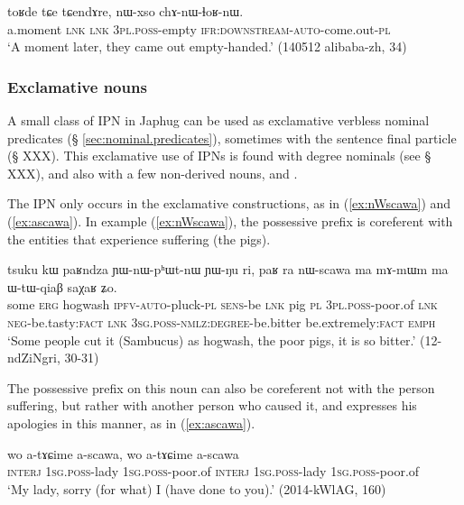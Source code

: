 \begin{exe}
\ex \label{ex:nWxso.chAnWlhoRnW}
\gll toʁde tɕe tɕendɤre, nɯ-xso chɤ-nɯ-ɬoʁ-nɯ. \\
a.moment \textsc{lnk} \textsc{lnk} \textsc{3pl.poss}-empty \textsc{ifr}:\textsc{downstream}-\textsc{auto}-come.out-\textsc{pl} \\
\glt `A moment later, they came out empty-handed.' (140512 alibaba-zh, 34)
\end{exe} 

\subsubsection{Exclamative nouns}
A small class of IPN in Japhug can be used as exclamative verbless nominal predicates (§ \ref{sec:nominal.predicates}), sometimes with the sentence final particle  (§ XXX). This exclamative use of IPNs is found with degree nominals (see § XXX), and also with a few non-derived nouns,  and .

The IPN  only occurs in the exclamative constructions, as in (\ref{ex:nWscawa}) and (\ref{ex:ascawa}). In example (\ref{ex:nWscawa}), the possessive prefix is coreferent with the entities that experience suffering (the pigs).

\begin{exe}
\ex \label{ex:nWscawa} 
\gll tsuku kɯ paʁndza ɲɯ-nɯ-pʰɯt-nɯ ɲɯ-ŋu ri, paʁ ra nɯ-scawa ma mɤ-mɯm ma ɯ-tɯ-qiaβ saχaʁ ʑo. \\
some \textsc{erg} hogwash \textsc{ipfv}-\textsc{auto}-pluck-\textsc{pl} \textsc{sens}-be \textsc{lnk} pig \textsc{pl} \textsc{3pl}.\textsc{poss}-poor.of \textsc{lnk} \textsc{neg}-be.tasty:\textsc{fact} \textsc{lnk} \textsc{3sg}.\textsc{poss}-\textsc{nmlz}:\textsc{degree}-be.bitter be.extremely:\textsc{fact} \textsc{emph} \\
\glt `Some people cut it (Sambucus) as hogwash, the poor pigs, it is so bitter.' (12-ndZiNgri, 30-31)
\end{exe}

The possessive prefix on this noun can also be coreferent not with the person suffering, but rather with another person who caused it, and expresses his apologies in this manner, as in (\ref{ex:ascawa}).

\begin{exe}
\ex \label{ex:ascawa}
\gll wo a-tɤɕime a-scawa, wo a-tɤɕime a-scawa \\
\textsc{interj} \textsc{1sg}.\textsc{poss}-lady \textsc{1sg}.\textsc{poss}-poor.of \textsc{interj} \textsc{1sg}.\textsc{poss}-lady \textsc{1sg}.\textsc{poss}-poor.of  \\ 
\glt `My lady, sorry (for what) I (have done to you).' (2014-kWlAG, 160)
\end{exe}

